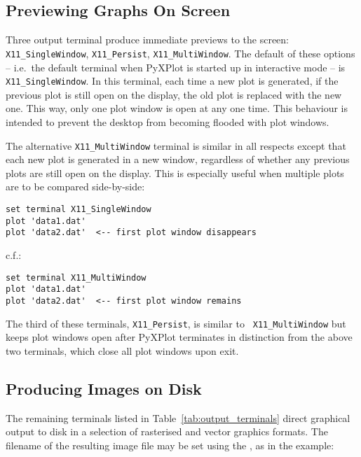 \subsection{Previewing Graphs On Screen}

Three output terminal produce immediate previews to the screen: {\tt
X11\_\-Single\-Window}, {\tt X11\_\-Persist}, {\tt X11\_\-Multi\-Window}.  The
default of these options -- i.e.\ the default terminal when PyXPlot is started
up in interactive mode -- is {\tt X11\_\-Single\-Window}.  In this terminal,
each time a new plot is generated, if the previous plot is still open on the
display, the old plot is replaced with the new one. This way, only one plot
window is open at any one time. This behaviour is intended to prevent the
desktop from becoming flooded with plot windows.

The alternative {\tt X11\_\-Multi\-Window} terminal is similar in all respects
except that each new plot is generated in a new window, regardless of whether
any previous plots are still open on the display. This is especially useful
when multiple plots are to be compared side-by-side:

\begin{verbatim}
set terminal X11_SingleWindow
plot 'data1.dat'
plot 'data2.dat'  <-- first plot window disappears
\end{verbatim}

\noindent c.f.:

\begin{verbatim}
set terminal X11_MultiWindow
plot 'data1.dat'
plot 'data2.dat'  <-- first plot window remains
\end{verbatim}

The third of these terminals, {\tt X11\_\-Persist}, is similar to {\tt
X11\_\-Multi\-Window} but keeps plot windows open after PyXPlot terminates in
distinction from the above two terminals, which close all plot windows upon
exit.

\subsection{Producing Images on Disk}

The remaining terminals listed in Table~\ref{tab:output_terminals} direct
graphical output to disk in a selection of rasterised and vector graphics
formats. The filename of the resulting image file may be set using the
, as in the example:

